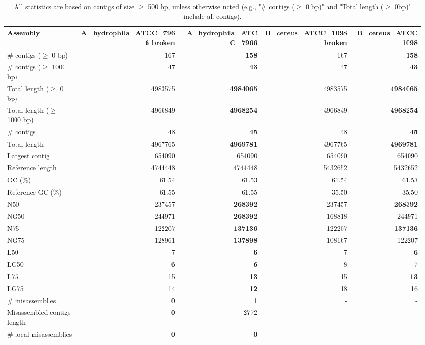 \documentclass[12pt,a4paper]{article}
\begin{document}
\begin{table}[ht]
\begin{center}
\caption{All statistics are based on contigs of size $\geq$ 500 bp, unless otherwise noted (e.g., "\# contigs ($\geq$ 0 bp)" and "Total length ($\geq$ 0bp)" include all contigs).}
\begin{tabular}{|l*{4}{|r}|}
\hline
Assembly & A\_hydrophila\_ATCC\_7966 broken & A\_hydrophila\_ATCC\_7966 & B\_cereus\_ATCC\_1098 broken & B\_cereus\_ATCC\_1098 \\ \hline
\# contigs ($\geq$ 0 bp) & 167 & {\bf 158} & 167 & {\bf 158} \\ \hline
\# contigs ($\geq$ 1000 bp) & 47 & {\bf 43} & 47 & {\bf 43} \\ \hline
Total length ($\geq$ 0 bp) & 4983575 & {\bf 4984065} & 4983575 & {\bf 4984065} \\ \hline
Total length ($\geq$ 1000 bp) & 4966849 & {\bf 4968254} & 4966849 & {\bf 4968254} \\ \hline
\# contigs & 48 & {\bf 45} & 48 & {\bf 45} \\ \hline
Total length & 4967765 & {\bf 4969781} & 4967765 & {\bf 4969781} \\ \hline
Largest contig & 654090 & 654090 & 654090 & 654090 \\ \hline
Reference length & 4744448 & 4744448 & 5432652 & 5432652 \\ \hline
GC (\%) & 61.54 & 61.53 & 61.54 & 61.53 \\ \hline
Reference GC (\%) & 61.55 & 61.55 & 35.50 & 35.50 \\ \hline
N50 & 237457 & {\bf 268392} & 237457 & {\bf 268392} \\ \hline
NG50 & 244971 & {\bf 268392} & 168818 & 244971 \\ \hline
N75 & 122207 & {\bf 137136} & 122207 & {\bf 137136} \\ \hline
NG75 & 128961 & {\bf 137898} & 108167 & 122207 \\ \hline
L50 & 7 & {\bf 6} & 7 & {\bf 6} \\ \hline
LG50 & {\bf 6} & {\bf 6} & 8 & 7 \\ \hline
L75 & 15 & {\bf 13} & 15 & {\bf 13} \\ \hline
LG75 & 14 & {\bf 12} & 18 & 16 \\ \hline
\# misassemblies & {\bf 0} & 1 & - & - \\ \hline
Misassembled contigs length & {\bf 0} & 2772 & - & - \\ \hline
\# local misassemblies & {\bf 0} & {\bf 0} & - & - \\ \hline

\end{tabular}
\end{center}
\end{table}
\end{document}
